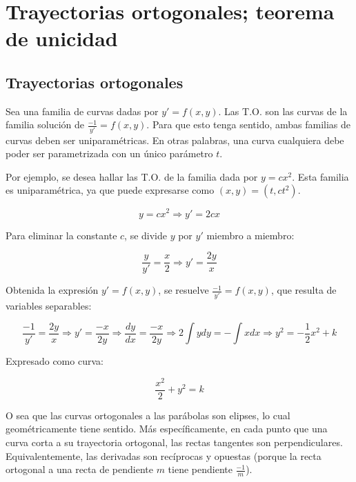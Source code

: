 \documentclass{article}
\begin{document}
\section{Trayectorias ortogonales; teorema de unicidad}

\subsection{Trayectorias ortogonales}

Sea una familia de curvas dadas por $y' = f(x,y)$. Las T.O. son las curvas de la familia solución de $\frac{-1}{y'} = f(x,y)$. Para que esto tenga sentido, ambas familias de curvas deben ser uniparamétricas. En otras palabras, una curva cualquiera debe poder ser parametrizada con un único parámetro $t$.

Por ejemplo, se desea hallar las T.O. de la familia dada por $y = c x^2$. Esta familia es uniparamétrica, ya que puede expresarse como $(x, y) = (t, c t^2)$.

\begin{equation}
y = c x^2 \Rightarrow y' = 2 c x
\end{equation}

Para eliminar la constante $c$, se divide $y$ por $y'$ miembro a miembro:

\begin{equation}
\frac{y}{y'} = \frac{x}{2} \Rightarrow y' = \frac{2y}{x}
\end{equation}

Obtenida la expresión $y' = f(x,y)$, se resuelve $\frac{-1}{y'} = f(x,y)$, que resulta de variables separables:

\begin{equation}
\frac{-1}{y'} = \frac{2y}{x} \Rightarrow y' = \frac{-x}{2y} \Rightarrow \frac{dy}{dx} = \frac{-x}{2y} \Rightarrow 2 \int y dy = -\int x dx \Rightarrow y^2 = -\frac{1}{2} x^2 + k
\end{equation}

Expresado como curva:

\begin{equation}
\frac{x^2}{2} + y^2 = k
\end{equation}

O sea que las curvas ortogonales a las parábolas son elipses, lo cual geométricamente tiene sentido. Más específicamente, en cada punto que una curva corta a su trayectoria ortogonal, las rectas tangentes son perpendiculares. Equivalentemente, las derivadas son recíprocas y opuestas (porque la recta ortogonal a una recta de pendiente $m$ tiene pendiente $\frac{-1}{m}$).
\end{document}
